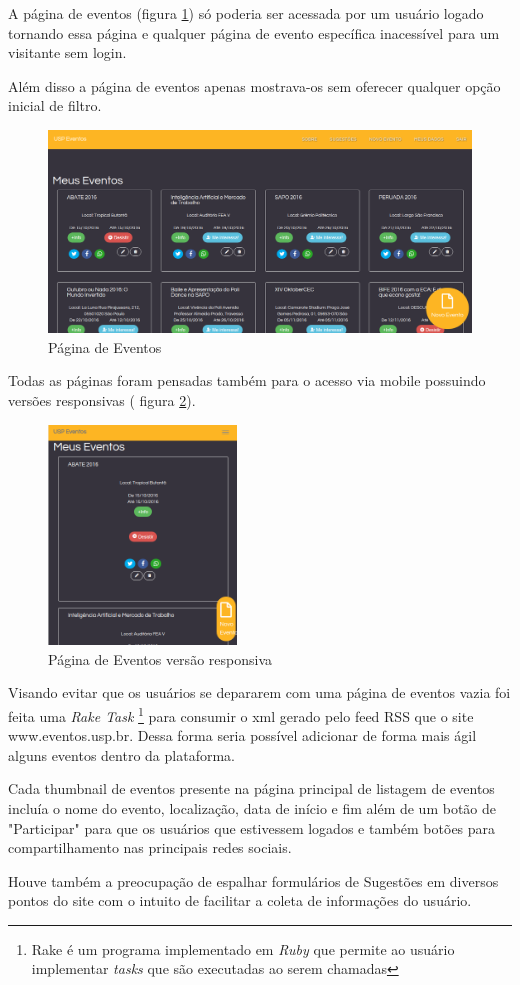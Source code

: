 		\par A página de eventos (figura \ref{fig:events_pagev1}) só poderia ser acessada por um usuário logado tornando essa página e qualquer página de evento específica inacessível para um visitante sem login.
        \par Além disso a página de eventos apenas mostrava-os sem oferecer qualquer opção inicial de filtro.
        \begin{figure}[htb]
		\includegraphics[width=15cm]{figuras/events_pagev1}
		\caption{\label{fig:events_pagev1} Página de Eventos}
		\end{figure}
\par Todas as páginas foram pensadas também para o acesso via mobile possuindo versões responsivas ( figura \ref{fig:events_pagev1_responsive}).
        \begin{figure}[htb]
		\includegraphics[width=5cm]{figuras/events_pagev1_responsive}
		\caption{\label{fig:events_pagev1_responsive} Página de Eventos versão responsiva}
		\end{figure}
\par Visando evitar que os usuários se depararem com uma página de eventos vazia foi feita uma \emph{Rake Task} \footnote{Rake é um programa implementado em \emph{Ruby} que permite ao usuário implementar \emph{tasks} que são executadas ao serem chamadas} para consumir o xml gerado pelo feed RSS que o site www.eventos.usp.br. Dessa forma seria possível adicionar de forma mais ágil alguns eventos dentro da plataforma.
\par Cada thumbnail de eventos presente na página principal de listagem de eventos incluía o nome do evento, localização, data de início e fim além de um botão de "Participar" para que os usuários que estivessem logados e também botões para compartilhamento nas principais redes sociais.
\par Houve também a preocupação de espalhar formulários de Sugestões em diversos pontos do site com o intuito de facilitar a coleta de informações do usuário.
